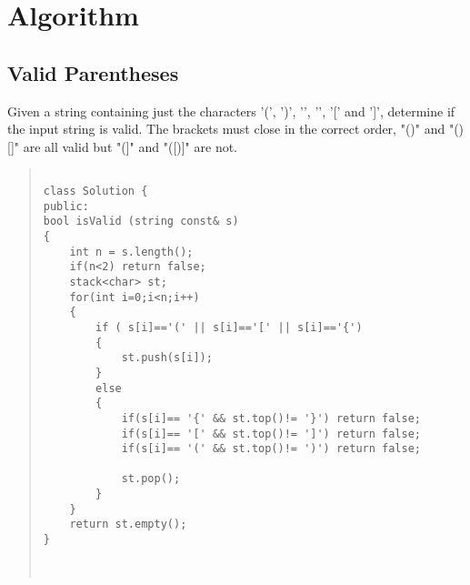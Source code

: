 \chapter{Algorithm}\label{chp:Stack}

\section{Valid Parentheses}

Given a string containing just the characters '(', ')', '{', '}', '[' and ']', determine if the input string is valid.
The brackets must close in the correct order, "()" and "()[]{}" are all valid but "(]" and "([)]" are not.

\begin{quote}
\begin{verbatim}

class Solution {
public:
bool isValid (string const& s) 
{
	int n = s.length();
	if(n<2) return false;
	stack<char> st;
	for(int i=0;i<n;i++)
	{
		if ( s[i]=='(' || s[i]=='[' || s[i]=='{')
		{
			st.push(s[i]);
		}
		else
		{
			if(s[i]== '{' && st.top()!= '}') return false;
			if(s[i]== '[' && st.top()!= ']') return false;
			if(s[i]== '(' && st.top()!= ')') return false;
			
			st.pop();
		}
	}
	return st.empty();
}



\end{verbatim}
\end{quote}



